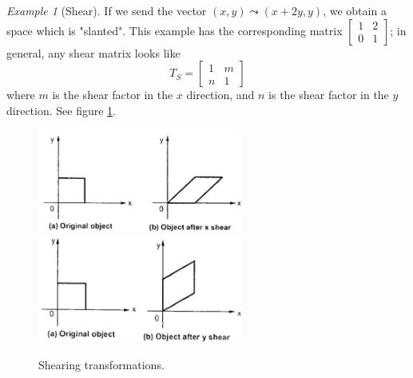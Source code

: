\documentclass[10pt, a4paper]{amsart}
\theoremstyle{definition}
\theoremstyle{remark}
\newtheorem{ex}{Example}
\begin{document}
\begin{ex}[Shear]
  If we send the vector $ (x, y) \leadsto (x + 2y, y) $, we obtain a space which
  is "slanted". This example has the corresponding matrix $ \begin{bmatrix} 1 & 2 \\ 0 & 1 \end{bmatrix} $;
  in general, any shear matrix looks like
  \begin{displaymath}
    T_S = \begin{bmatrix} 1 & m \\ n & 1 \end{bmatrix}
  \end{displaymath}
  where $ m $ is the shear factor in the $ x $ direction, and $ n $ is the shear factor in
  the $ y $ direction. See figure \ref{fig:Shear}.

  \begin{figure}
    \includegraphics[width=0.6\textwidth]{710_shear_x}
    \includegraphics[width=0.6\textwidth]{710_shear_y}
    \caption{Shearing transformations.}
    \label{fig:Shear}
  \end{figure}
\end{ex}
\end{document}
